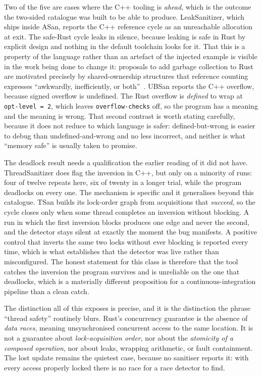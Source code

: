 \documentclass[english,twoside,openright,a4paper,censored,csm,software-track-2020]{HYthesisML}
\begin{document}
Two of the five are cases where the C++ tooling is \emph{ahead}, which is the outcome the
two-sided catalogue was built to be able to produce. LeakSanitizer, which ships inside ASan,
reports the C++ reference cycle as an unreachable allocation at exit. The safe-Rust cycle leaks
in silence, because leaking is safe in Rust by explicit design and nothing in the default
toolchain looks for it. That this is a property of the language rather than an artefact of the
injected example is visible in the work being done to change it: proposals to add garbage
collection to Rust are motivated precisely by shared-ownership structures that reference counting
expresses ``awkwardly, inefficiently, or both''~\cite{hughes2025gcrust}. UBSan reports the C++ overflow, because signed overflow is undefined.
The Rust overflow is \emph{defined} to wrap at \texttt{opt-level~=~2}, which leaves
\texttt{overflow-checks} off, so the program has a meaning and the meaning is wrong. That
second contrast is worth stating carefully, because it does not reduce to which language is
safer: defined-but-wrong is easier to debug than undefined-and-wrong and no less incorrect, and
neither is what ``memory safe'' is usually taken to promise.

The deadlock result needs a qualification the earlier reading of it did not have.
ThreadSanitizer does flag the inversion in C++, but only on a minority of runs: four of twelve
repeats here, six of twenty in a longer trial, while the program deadlocks on every one. The
mechanism is specific and it generalises beyond this catalogue. TSan builds its lock-order
graph from acquisitions that \emph{succeed}, so the cycle closes only when some thread completes
an inversion without blocking. A run in which the first inversion blocks produces one edge and
never the second, and the detector stays silent at exactly the moment the bug manifests. A
positive control that inverts the same two locks without ever blocking is reported every time,
which is what establishes that the detector was live rather than misconfigured. The honest
statement for this class is therefore that the tool catches the inversion the program survives
and is unreliable on the one that deadlocks, which is a materially different proposition for a
continuous-integration pipeline than a clean catch.

The distinction all of this exposes is precise, and it is the distinction the phrase ``thread
safety'' routinely blurs. Rust's concurrency guarantee is the absence of \emph{data races},
meaning unsynchronised concurrent access to the same location. It is not a guarantee about
\emph{lock-acquisition order}, nor about the \emph{atomicity of a composed operation}, nor
about leaks, wrapping arithmetic, or fault containment. The lost update remains the quietest
case, because no sanitiser reports it: with every access properly locked there is no race for a
race detector to find.
\end{document}
